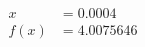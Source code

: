 \documentclass[preview]{standalone}
\begin{document}
\begin{align*}
x &= 0.0004\\f(x) &= 4.0075646
\end{align*}
\end{document}

